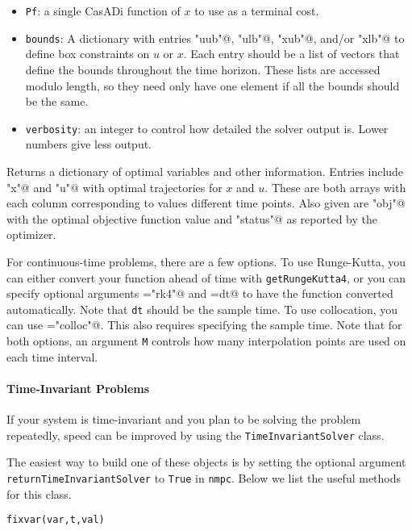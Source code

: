 \documentclass{article}
\newcommand{\funcname}[1]{\vspace{.25em}\noindent\texttt{#1}\vspace{.25em}}
\newcommand{\casadi}{CasADi}
\begin{document}
\begin{multicols}{2}
\begin{itemize}[noitemsep,nolistsep]
    \item \texttt{Pf}: a single \casadi{} function of $x$ to use as a terminal cost.
    \item \texttt{bounds}: A dictionary with entries \lstinline@"uub"@, \lstinline@"ulb"@, \lstinline@"xub"@, and/or \lstinline@"xlb"@ to define box constraints on $u$ or $x$.
    Each entry should be a list of vectors that define the bounds throughout the time horizon.
    These lists are accessed modulo length, so they need only have one element if all the bounds should be the same.
    \item \texttt{verbosity}: an integer to control how detailed the solver output is.
    Lower numbers give less output.
\end{itemize}

Returns a dictionary of optimal variables and other information.
Entries include \lstinline@"x"@ and \lstinline@"u"@ with optimal trajectories for $x$ and $u$.
These are both arrays with each column corresponding to values different time points.
Also given are \lstinline@"obj"@ with the optimal objective function value and \lstinline@"status"@ as reported by the optimizer.

For continuous-time problems, there are a few options.
To use Runge-Kutta, you can either convert your function ahead of time with \texttt{getRungeKutta4}, or you can specify optional arguments \lstinline@timemodel="rk4"@ and \lstinline@Delta=dt@ to have the function converted automatically.
Note that \texttt{dt} should be the sample time.
To use collocation, you can use \lstinline@timemodel="colloc"@.
This also requires specifying the sample time.
Note that for both options, an argument \texttt{M} controls how many interpolation points are used on each time interval.

\paragraph*{Time-Invariant Problems}

If your system is time-invariant and you plan to be solving the problem repeatedly, speed can be improved by using the \texttt{TimeInvariantSolver} class.

The easiest way to build one of these objects is by setting the optional argument \texttt{returnTimeInvariantSolver} to \texttt{True} in \texttt{nmpc}.
Below we list the useful methods for this class.

\funcname{fixvar(var,t,val)}


\end{multicols}
\end{document}
